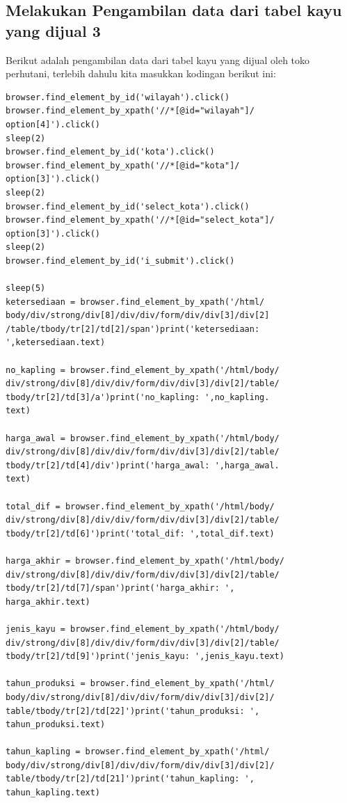 \subsection{Melakukan Pengambilan data dari tabel kayu yang dijual 3}
Berikut adalah pengambilan data dari tabel kayu 
yang dijual oleh toko perhutani, terlebih dahulu 
kita masukkan kodingan berikut ini:
\begin{verbatim}
browser.find_element_by_id('wilayah').click()
browser.find_element_by_xpath('//*[@id="wilayah"]/
option[4]').click()
sleep(2)
browser.find_element_by_id('kota').click()
browser.find_element_by_xpath('//*[@id="kota"]/
option[3]').click()
sleep(2)
browser.find_element_by_id('select_kota').click()
browser.find_element_by_xpath('//*[@id="select_kota"]/
option[3]').click()
sleep(2)
browser.find_element_by_id('i_submit').click()

sleep(5)
ketersediaan = browser.find_element_by_xpath('/html/
body/div/strong/div[8]/div/div/form/div/div[3]/div[2]
/table/tbody/tr[2]/td[2]/span')print('ketersediaan:
',ketersediaan.text)

no_kapling = browser.find_element_by_xpath('/html/body/
div/strong/div[8]/div/div/form/div/div[3]/div[2]/table/
tbody/tr[2]/td[3]/a')print('no_kapling: ',no_kapling.
text)

harga_awal = browser.find_element_by_xpath('/html/body/
div/strong/div[8]/div/div/form/div/div[3]/div[2]/table/
tbody/tr[2]/td[4]/div')print('harga_awal: ',harga_awal.
text)

total_dif = browser.find_element_by_xpath('/html/body/
div/strong/div[8]/div/div/form/div/div[3]/div[2]/table/
tbody/tr[2]/td[6]')print('total_dif: ',total_dif.text)

harga_akhir = browser.find_element_by_xpath('/html/body/
div/strong/div[8]/div/div/form/div/div[3]/div[2]/table/
tbody/tr[2]/td[7]/span')print('harga_akhir: ',
harga_akhir.text)

jenis_kayu = browser.find_element_by_xpath('/html/body/
div/strong/div[8]/div/div/form/div/div[3]/div[2]/table/
tbody/tr[2]/td[9]')print('jenis_kayu: ',jenis_kayu.text)

tahun_produksi = browser.find_element_by_xpath('/html/
body/div/strong/div[8]/div/div/form/div/div[3]/div[2]/
table/tbody/tr[2]/td[22]')print('tahun_produksi: ',
tahun_produksi.text)

tahun_kapling = browser.find_element_by_xpath('/html/
body/div/strong/div[8]/div/div/form/div/div[3]/div[2]/
table/tbody/tr[2]/td[21]')print('tahun_kapling: ',
tahun_kapling.text)


\end{verbatim}
